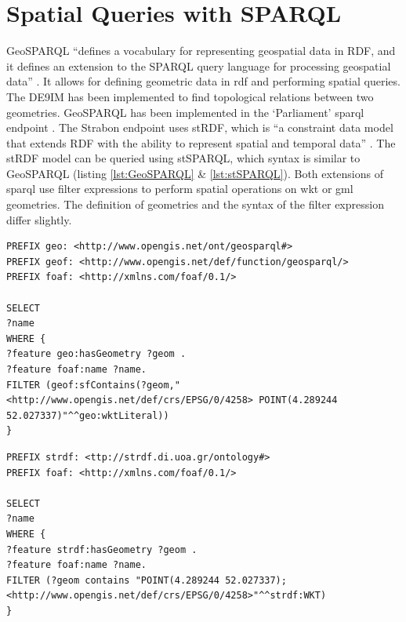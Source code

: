 \section{Spatial Queries with SPARQL}
\label{par:SpatialFilters}
GeoSPARQL \enquote{defines a vocabulary for representing geospatial data in RDF, and it defines an extension to the SPARQL query language for processing geospatial data} \cite[p. xvi]{LD:OGC}. It allows for defining geometric data in \ac{rdf} and performing spatial queries. The \ac{DE9IM} \citep{GIS:9IM} has been implemented to find topological relations between two geometries. GeoSPARQL has been implemented in the `Parliament' \ac{sparql} endpoint \citep{LD:GeoSPARQL}. The Strabon endpoint uses stRDF, which is \enquote{a constraint data model that extends RDF with the ability to represent spatial and temporal data} \cite[p. 425]{SSW:Koubarakis}. The stRDF model can be queried using stSPARQL, which syntax is similar to GeoSPARQL (listing \ref{lst:GeoSPARQL} \& \ref{lst:stSPARQL}). Both extensions of \ac{sparql} use filter expressions to perform spatial operations on \ac{wkt} or \ac{gml} geometries. The definition of geometries and the syntax of the filter expression differ slightly.

\begin{lstlisting}[caption={A GeoSPARQL query to find the names of features that contain a point geometry}, label={lst:GeoSPARQL}]
PREFIX geo: <http://www.opengis.net/ont/geosparql#>
PREFIX geof: <http://www.opengis.net/def/function/geosparql/>
PREFIX foaf: <http://xmlns.com/foaf/0.1/> 

SELECT 
?name
WHERE {
?feature geo:hasGeometry ?geom .
?feature foaf:name ?name.
FILTER (geof:sfContains(?geom,"<http://www.opengis.net/def/crs/EPSG/0/4258> POINT(4.289244 52.027337)"^^geo:wktLiteral))
}
\end{lstlisting}

\begin{lstlisting}[caption={A stSPARQL query to find the names of features that contain a point geometry}, label={lst:stSPARQL}]
PREFIX strdf: <ttp://strdf.di.uoa.gr/ontology#>
PREFIX foaf: <http://xmlns.com/foaf/0.1/> 

SELECT 
?name
WHERE {
?feature strdf:hasGeometry ?geom .
?feature foaf:name ?name.
FILTER (?geom contains "POINT(4.289244 52.027337);<http://www.opengis.net/def/crs/EPSG/0/4258>"^^strdf:WKT)
}
\end{lstlisting}


